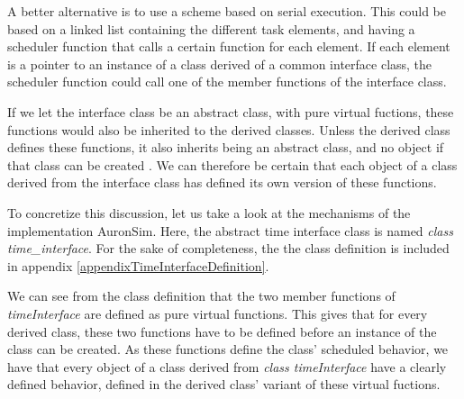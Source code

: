 	A better alternative is to use a scheme based on serial execution. %
	This could be based on a linked list containing the different task elements, and having a scheduler function that calls a certain function for each element.
	If each element is a pointer to an instance of a class derived of a common interface class, the scheduler function could call one of the member functions of the interface class.

	If we let the interface class be an abstract class, with pure virtual fuctions, these functions would also be inherited to the derived classes.
	Unless the derived class defines these functions, it also inherits being an abstract class, and no object if that class can be created \cite{Stroustrup2000KAP12}.
	We can therefore be certain that each object of a class derived from the interface class has defined its own version of these functions.

	To concretize this discussion, let us take a look at the mechanisms of the implementation AuronSim.
	Here, the abstract time interface class is named \emph{class time\_interface}.
	For the sake of completeness, the the class definition is included in appendix \ref{appendixTimeInterfaceDefinition}. %

	We can see from the class definition that the two member functions of \emph{timeInterface} are defined as pure virtual functions.
	This gives that for every derived class, these two functions have to be defined before an instance of the class can be created.
	As these functions define the class' scheduled behavior, we have that every object of a class derived from \emph{class timeInterface} have a clearly defined behavior, defined in the derived class' variant of these virtual fuctions.

